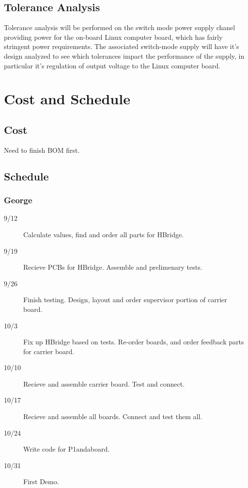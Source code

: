 \documentclass[12pt]{article}
\begin{document}
 \subsection{Tolerance Analysis}
    Tolerance analysis will be performed on the switch mode power supply chanel providing power for the on-board Linux computer board, which has fairly stringent power requirements. The associated switch-mode supply will have it's design analyzed to see which tolerances impact the performance of the supply, in particular it's regulation of output voltage to the Linux computer board.
 \section{Cost and Schedule}
 \subsection{Cost}
  Need to finish BOM first.
 \subsection{Schedule}
 \subsubsection{George}
 \begin{description}
  \item[9/12] Calculate values, find and order all parts for HBridge.
  \item[9/19] Recieve PCBs for HBridge. Assemble and prelimenary tests.
  \item[9/26] Finish testing.  Design, layout and order supervisor portion of carrier board.
  \item[10/3] Fix up HBridge based on tests. Re-order boards, and order feedback parts for carrier board.
  \item[10/10] Recieve and assemble carrier board. Test and connect.
  \item[10/17] Recieve and assemble all boards. Connect and test them all.
  \item[10/24] Write code for P1andaboard.
  \item[10/31] First Demo.
\end{description}
\end{document}
